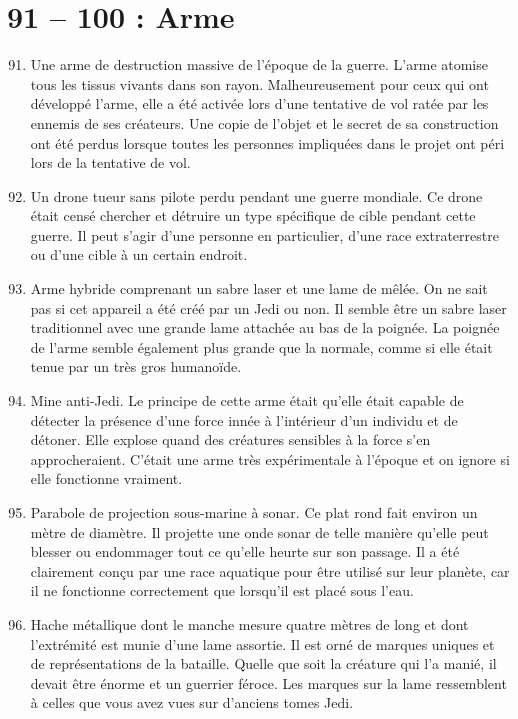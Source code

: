 \documentclass{article}
\begin{document}
\section*{91 -- 100 : Arme}
\begin{enumerate}
	\setcounter{enumi}{90}
	\item Une arme de destruction massive de l'époque de la guerre. L'arme atomise tous les tissus vivants dans son rayon. Malheureusement pour ceux qui ont développé l'arme, elle a été activée lors d'une tentative de vol ratée par les ennemis de ses créateurs. Une copie de l'objet et le secret de sa construction ont été perdus lorsque toutes les personnes impliquées dans le projet ont péri lors de la tentative de vol.
	\item Un drone tueur sans pilote perdu pendant une guerre mondiale. Ce drone était censé chercher et détruire un type spécifique de cible pendant cette guerre. Il peut s'agir d'une personne en particulier, d'une race extraterrestre ou d'une cible à un certain endroit.
	\item Arme hybride comprenant un sabre laser et une lame de mêlée. On ne sait pas si cet appareil a été créé par un Jedi ou non. Il semble être un sabre laser traditionnel avec une grande lame attachée au bas de la poignée. La poignée de l'arme semble également plus grande que la normale, comme si elle était tenue par un très gros humanoïde.
	\item Mine anti-Jedi. Le principe de cette arme était qu'elle était capable de détecter la présence d'une force innée à l'intérieur d'un individu et de détoner. Elle explose quand des créatures sensibles à la force s'en approcheraient. C'était une arme très expérimentale à l'époque et on ignore si elle fonctionne vraiment.
	\item Parabole de projection sous-marine à sonar. Ce plat rond fait environ un mètre de diamètre. Il projette une onde sonar de telle manière qu'elle peut blesser ou endommager tout ce qu'elle heurte sur son passage. Il a été clairement conçu par une race aquatique pour être utilisé sur leur planète, car il ne fonctionne correctement que lorsqu'il est placé sous l'eau.
	\item Hache métallique dont le manche mesure quatre mètres de long et dont l'extrémité est munie d'une lame assortie. Il est orné de marques uniques et de représentations de la bataille. Quelle que soit la créature qui l'a manié, il devait être énorme et un guerrier féroce. Les marques sur la lame ressemblent à celles que vous avez vues sur d'anciens tomes Jedi.

\end{enumerate}
\end{document}
